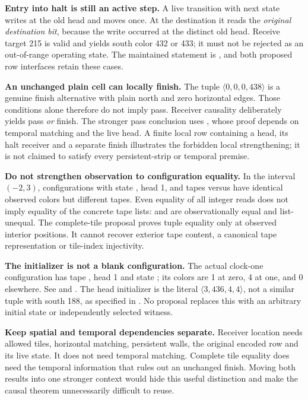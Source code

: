 \textbf{Entry into halt is still an active step.} A live transition with next state  writes at the old head and moves once. At the destination it reads the \emph{original destination bit}, because the write occurred at the distinct old head. Receive target 215 is valid and yields south color 432 or 433; it must not be rejected as an out-of-range operating state. The maintained statement is , and both proposed row interfaces retain these cases.

\textbf{An unchanged plain cell can locally finish.} The tuple $\langle0,0,0,438\rangle$ is a genuine finish alternative with plain north and zero horizontal edges. Those conditions alone therefore do not imply pass. Receiver causality deliberately yields pass \emph{or} finish. The stronger pass conclusion uses , whose proof depends on temporal matching and the live head. A finite local row containing a head, its halt receiver and a separate finish illustrates the forbidden local strengthening; it is not claimed to satisfy every persistent-strip or temporal premise.

\textbf{Do not strengthen observation to configuration equality.} In the interval $(-2,3)$, configurations with state , head 1, and tapes \code{[0]} versus \code{[0,100]} have identical observed colors but different tapes. Even equality of all integer reads does not imply equality of the concrete tape lists: \code{[0]} and \code{[0,0]} are observationally equal and list-unequal. The complete-tile proposal proves tuple equality only at observed interior positions. It cannot recover exterior tape content, a canonical tape representation or tile-index injectivity.

\textbf{The initializer is not a blank configuration.} The actual clock-one configuration has tape \code{[0]}, head 1 and state ; its colors are 1 at zero, 4 at one, and 0 elsewhere. See  and . The head initializer is the literal $\langle3,436,4,4\rangle$, not a similar tuple with south 188, as specified in . No proposal replaces this with an arbitrary initial state or independently selected witness.

\textbf{Keep spatial and temporal dependencies separate.} Receiver location needs allowed tiles, horizontal matching, persistent walls, the original encoded row and its live state. It does not need temporal matching. Complete tile equality does need the temporal information that rules out an unchanged finish. Moving both results into one stronger context would hide this useful distinction and make the causal theorem unnecessarily difficult to reuse.

